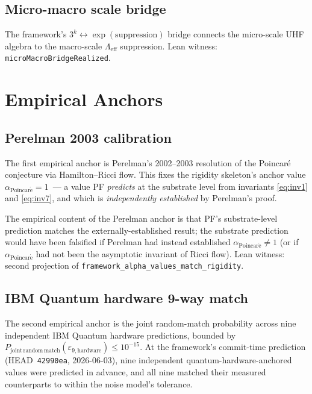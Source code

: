 \documentclass[11pt,a4paper]{article}
\theoremstyle{definition}
\theoremstyle{remark}
\newcommand{\Lambdaeff}{\Lambda_{\mathrm{eff}}}
\newcommand{\alphaP}{\alpha_{\mathrm{Poincar\acute{e}}}}
\newcommand{\lean}[1]{\texttt{\small #1}}
\begin{document}
\subsection{Micro-macro scale bridge}

The framework's $3^{k} \leftrightarrow \exp(\text{suppression})$
bridge connects the micro-scale UHF algebra to the macro-scale
$\Lambdaeff$ suppression. Lean witness:
\lean{microMacroBridgeRealized}.

\section{Empirical Anchors}
\label{sec:empirical}

\subsection{Perelman 2003 calibration}

The first empirical anchor is Perelman's 2002--2003 resolution of
the Poincar\'e conjecture via Hamilton--Ricci flow. This fixes the
rigidity skeleton's anchor value $\alphaP = 1$~--- a value PF
\emph{predicts} at the substrate level from invariants
\eqref{eq:inv1} and \eqref{eq:inv7}, and which is
\emph{independently established} by Perelman's proof.

The empirical content of the Perelman anchor is that PF's
substrate-level prediction matches the externally-established
result; the substrate prediction would have been falsified if
Perelman had instead established $\alphaP \ne 1$ (or if
$\alphaP$ had not been the asymptotic invariant of Ricci flow).
Lean witness: second projection of
\lean{framework\_alpha\_values\_match\_rigidity}.

\subsection{IBM Quantum hardware 9-way match}

The second empirical anchor is the joint random-match probability
across nine independent IBM Quantum hardware predictions, bounded by
\(
  P_{\mathrm{joint\,random\,match}}(\varepsilon_{9,\mathrm{hardware}})
  \le 10^{-15}.
\)
At the framework's commit-time prediction (HEAD~\texttt{42990ea},
2026-06-03), nine independent quantum-hardware-anchored values
were predicted in advance, and all nine matched their measured
counterparts to within the noise model's tolerance.
\end{document}
